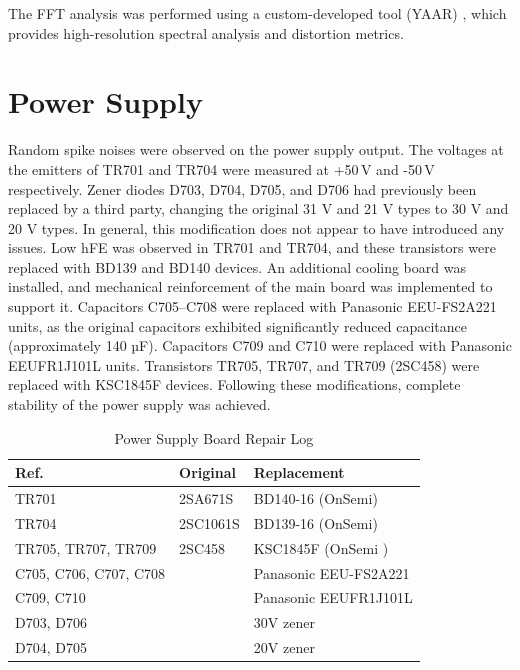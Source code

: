 \documentclass[]{article}
\begin{document}
The FFT analysis was performed using a custom-developed tool (YAAR) \cite{yaar}, which provides high-resolution spectral analysis and distortion metrics.

\section{Power Supply}

Random spike noises were observed on the power supply output.
The voltages at the emitters of TR701 and TR704 were measured at +50\,V and -50\,V respectively.
Zener diodes D703, D704, D705, and D706 had previously been replaced by a third party, changing the original 31 V and 21 V types to 30 V and 20 V types. In general, this modification does not appear to have introduced any issues.
Low hFE was observed in TR701 and TR704, and these transistors were replaced with BD139 and BD140 devices. An additional cooling board was installed, and mechanical reinforcement of the main board was implemented to support it.
Capacitors C705–C708 were replaced with Panasonic EEU-FS2A221 units, as the original capacitors exhibited significantly reduced capacitance (approximately 140 µF). Capacitors C709 and C710 were replaced with Panasonic EEUFR1J101L units.
Transistors TR705, TR707, and TR709 (2SC458) were replaced with KSC1845F devices.
Following these modifications, complete stability of the power supply was achieved.

\begin{table}[H]
	\centering
	\caption{Power Supply Board Repair Log}
	\label{tab:repair_log_tone_control_board}
	\begin{tabular}{|l|l|l|}
		\hline
		\textbf{Ref.} & \textbf{Original} & \textbf{Replacement} \\
		\hline
		TR701 & 2SA671S   & BD140-16 (OnSemi) \\
                TR704 & 2SC1061S  & BD139-16 (OnSemi) \\
                TR705, TR707, TR709 & 2SC458 & KSC1845F (OnSemi )\\
                C705, C706, C707, C708 &   & Panasonic EEU-FS2A221 \\
                C709, C710 & &  Panasonic EEUFR1J101L \\ 
                D703, D706 &  & 30V zener \\
                D704, D705 &  & 20V zener \\ 
		\hline
	\end{tabular}
\end{table}
\end{document}
